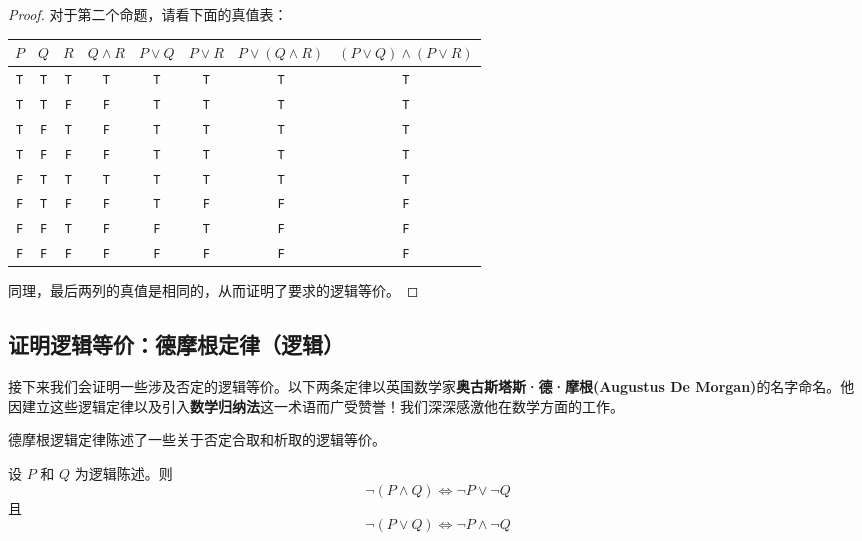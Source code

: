 \begin{proof}
    对于第二个命题，请看下面的真值表：
    \begin{center}
        \begin{tabular}{c|c|c|c|c|c|c|c}
              $P$ & $Q$ & $R$ & $Q \land R$ & $P \lor Q$  & $P \lor R$ & $P \lor (Q \land R)$ & $(P \lor Q) \land (P \lor R)$ \\
              \hline
              \verb|T| & \verb|T| & \verb|T| &  \verb|T|  &   \verb|T|   &\verb|T| &\verb|T| &   \verb|T|   \\
              \verb|T| & \verb|T| & \verb|F| &  \verb|F|  &   \verb|T|   &\verb|T| &\verb|T| &   \verb|T|   \\
              \verb|T| & \verb|F| & \verb|T| &  \verb|F|  &   \verb|T|   &\verb|T| &\verb|T| &   \verb|T|   \\
              \verb|T| & \verb|F| & \verb|F| &  \verb|F|  &   \verb|T|   &\verb|T| &\verb|T| &   \verb|T|   \\
              \verb|F| & \verb|T| & \verb|T| &  \verb|T|  &   \verb|T|   &\verb|T| &\verb|T| &   \verb|T|   \\
              \verb|F| & \verb|T| & \verb|F| &  \verb|F|  &   \verb|T|   &\verb|F| &\verb|F| &   \verb|F|   \\
              \verb|F| & \verb|F| & \verb|T| &  \verb|F|  &   \verb|F|   &\verb|T| &\verb|F| &   \verb|F|   \\
              \verb|F| & \verb|F| & \verb|F| &  \verb|F|  &   \verb|F|   &\verb|F| &\verb|F| &   \verb|F|   \\
        \end{tabular}
    \end{center}

    同理，最后两列的真值是相同的，从而证明了要求的逻辑等价。
\end{proof}

\subsection{证明逻辑等价：德摩根定律（逻辑）}\label{sec:section4.6.5}

接下来我们会证明一些涉及否定的逻辑等价。以下两条定律以英国数学家\textbf{奥古斯塔斯·德·摩根(Augustus De Morgan)}的名字命名。他因建立这些逻辑定律以及引入\textbf{数学归纳法}这一术语而广受赞誉！我们深深感激他在数学方面的工作。

德摩根逻辑定律陈述了一些关于否定合取和析取的逻辑等价。

\begin{theorem}
    设 $P$ 和 $Q$ 为逻辑陈述。则
    \[\neg (P \land Q) \iff \neg P \lor \neg Q\]
    且
    \[\neg (P \lor Q) \iff \neg P \land \neg Q\]
\end{theorem}

